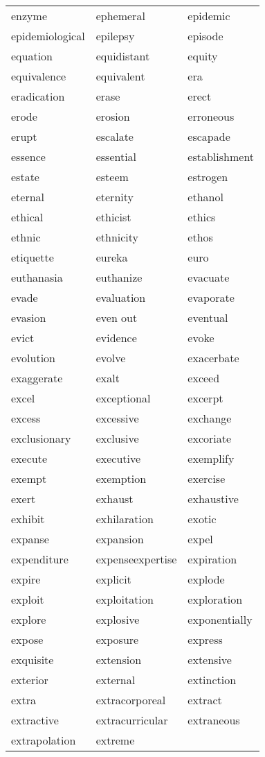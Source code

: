 \documentclass{minimal}
\begin{document}
\begin{longtable}{p{2.8cm}p{2.8cm}p{2.8cm}}
enzyme & ephemeral & epidemic \\
epidemiological & epilepsy & episode \\
equation & equidistant & equity \\
equivalence & equivalent & era \\
eradication & erase & erect \\
erode & erosion & erroneous \\
erupt & escalate & escapade \\
essence & essential & establishment \\
estate & esteem & estrogen \\
eternal & eternity & ethanol \\
ethical & ethicist & ethics \\
ethnic & ethnicity & ethos \\
etiquette & eureka & euro \\
euthanasia & euthanize & evacuate \\
evade & evaluation & evaporate \\
evasion & even out & eventual \\
evict & evidence & evoke \\
evolution & evolve & exacerbate \\
exaggerate & exalt & exceed \\
excel & exceptional & excerpt \\
excess & excessive & exchange \\
exclusionary & exclusive & excoriate \\
execute & executive & exemplify \\
exempt & exemption & exercise \\
exert & exhaust & exhaustive \\
exhibit & exhilaration & exotic \\
expanse & expansion & expel \\
expenditure & expenseexpertise & expiration \\
expire & explicit & explode \\
exploit & exploitation & exploration \\
explore & explosive & exponentially \\
expose & exposure & express \\
exquisite & extension & extensive \\
exterior & external & extinction \\
extra & extracorporeal & extract \\
extractive & extracurricular & extraneous \\
extrapolation & extreme
\end{longtable}
\end{document}
